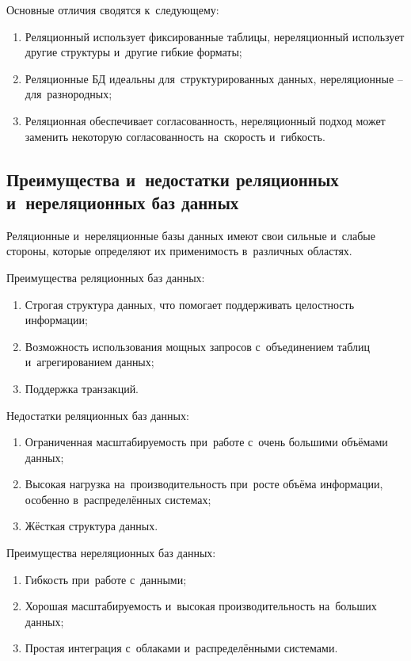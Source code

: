 \documentclass{ou}
\begin{document}
Основные отличия сводятся к~следующему:
\begin{enumerate}[leftmargin=0em, itemindent=3.75em, nosep, label=\arabic*)]
\item Реляционный использует фиксированные таблицы, нереляционный использует другие структуры и~другие гибкие форматы;
\item Реляционные БД идеальны для~структурированных данных, нереляционные -- для~разнородных;
\item Реляционная обеспечивает согласованность, нереляционный подход может заменить некоторую согласованность на~скорость и~гибкость.
\end{enumerate}
\subsection{Преимущества и~недостатки реляционных и~нереляционных баз данных}
Реляционные и~нереляционные базы данных имеют свои сильные и~слабые стороны, которые определяют их применимость в~различных областях.

Преимущества реляционных баз данных: 
\begin{enumerate}[leftmargin=0em, itemindent=3.75em, nosep, label=\arabic*)]
\item Строгая структура данных, что помогает поддерживать целостность информации;
\item Возможность использования мощных запросов с~объединением таблиц и~агрегированием данных;
\item Поддержка транзакций.
\end{enumerate}

Недостатки реляционных баз данных:
\begin{enumerate}[leftmargin=0em, itemindent=3.75em, nosep, label=\arabic*)]
\item Ограниченная масштабируемость при~работе с~очень большими объёмами данных;
\item Высокая нагрузка на~производительность при~росте объёма информации, особенно в~распределённых системах;
\item Жёсткая структура данных.
\end{enumerate}

Преимущества нереляционных баз данных:
\begin{enumerate}[leftmargin=0em, itemindent=3.75em, nosep, label=\arabic*)]
\item Гибкость при~работе с~данными;
\item Хорошая масштабируемость и~высокая производительность на~больших данных;
\item Простая интеграция с~облаками и~распределёнными системами.
\end{enumerate}
\end{document}
